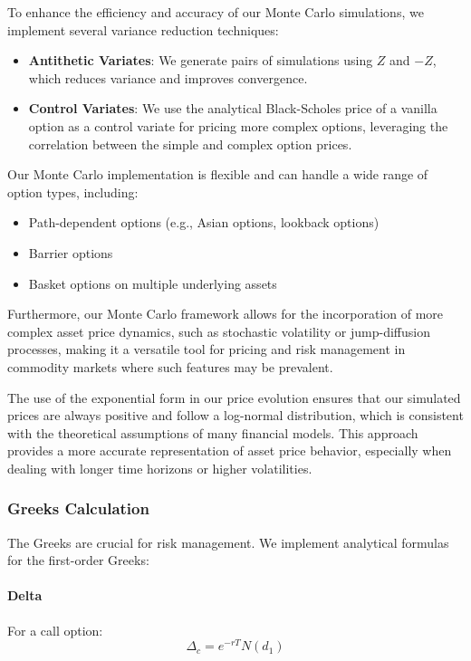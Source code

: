 \documentclass[12pt]{article}
\begin{document}
To enhance the efficiency and accuracy of our Monte Carlo simulations, we implement several variance reduction techniques:

\begin{itemize}
    \item \textbf{Antithetic Variates}: We generate pairs of simulations using $Z$ and $-Z$, which reduces variance and improves convergence.
    
    \item \textbf{Control Variates}: We use the analytical Black-Scholes price of a vanilla option as a control variate for pricing more complex options, leveraging the correlation between the simple and complex option prices.
    
\end{itemize}

Our Monte Carlo implementation is flexible and can handle a wide range of option types, including:

\begin{itemize}
    \item Path-dependent options (e.g., Asian options, lookback options)
    \item Barrier options
    \item Basket options on multiple underlying assets
\end{itemize}

Furthermore, our Monte Carlo framework allows for the incorporation of more complex asset price dynamics, such as stochastic volatility or jump-diffusion processes, making it a versatile tool for pricing and risk management in commodity markets where such features may be prevalent.

The use of the exponential form in our price evolution ensures that our simulated prices are always positive and follow a log-normal distribution, which is consistent with the theoretical assumptions of many financial models. This approach provides a more accurate representation of asset price behavior, especially when dealing with longer time horizons or higher volatilities.

\subsubsection{Greeks Calculation}

The Greeks are crucial for risk management. We implement analytical formulas for the first-order Greeks:

\paragraph{Delta}
For a call option:
\begin{equation}
    \Delta_c = e^{-rT} N(d_1)
\end{equation}
\end{document}
